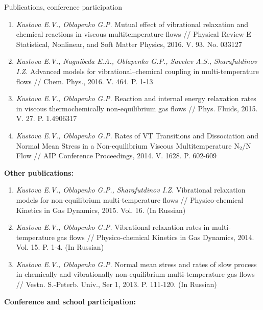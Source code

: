 \documentclass{resume} %
\begin{document}
\begin{rSection}{Publications, conference participation}
\begin{enumerate}
\item  \emph{Kustova E.V., Oblapenko G.P.} Mutual effect of vibrational relaxation and chemical reactions in viscous multitemperature flows // Physical Review E -- Statistical, Nonlinear, and Soft Matter Physics, 2016. V. 93. No. 033127

\item  \emph{Kustova E.V., Nagnibeda E.A., Oblapenko G.P., Savelev A.S., Sharafutdinov I.Z.} Advanced models for vibrational–chemical coupling in multi-temperature flows // Chem. Phys., 2016. V. 464. P. 1-13

\item  \emph{Kustova E.V., Oblapenko G.P.} Reaction and internal energy relaxation rates in viscous thermochemically non-equilibrium gas flows // Phys. Fluids, 2015. V. 27. P. 1.4906317

\item  \emph{Kustova E.V., Oblapenko G.P.} Rates of VT Transitions and Dissociation and Normal Mean Stress in a Non-equilibrium Viscous Multitemperature N$_2$/N Flow // AIP Conference Proceedings, 2014. V. 1628. P. 602-609


\end{enumerate}


{\bf Other publications:}

\begin{enumerate}
    \item  \emph{Kustova E.V., Oblapenko G.P., Sharafutdinov I.Z.} Vibrational relaxation models for non-equilibrium multi-temperature flows // Physico-chemical Kinetics in Gas Dynamics, 2015. Vol. 16. (In Russian)

    \item  \emph{Kustova E.V., Oblapenko G.P.} Vibrational relaxation rates in multi-temperature gas flows // Physico-chemical Kinetics in Gas Dynamics, 2014. Vol. 15. P. 1-4. (In Russian)

    \item  \emph{Kustova E.V., Oblapenko G.P.} Normal mean stress and rates of slow process in chemically and vibrationally non-equilibrium multi-temperature gas flows // Vestn. S.-Peterb. Univ., Ser 1, 2013. P. 111-120. (In Russian)
\end{enumerate}

{\bf Conference and school participation:}


\end{rSection}
\end{document}
